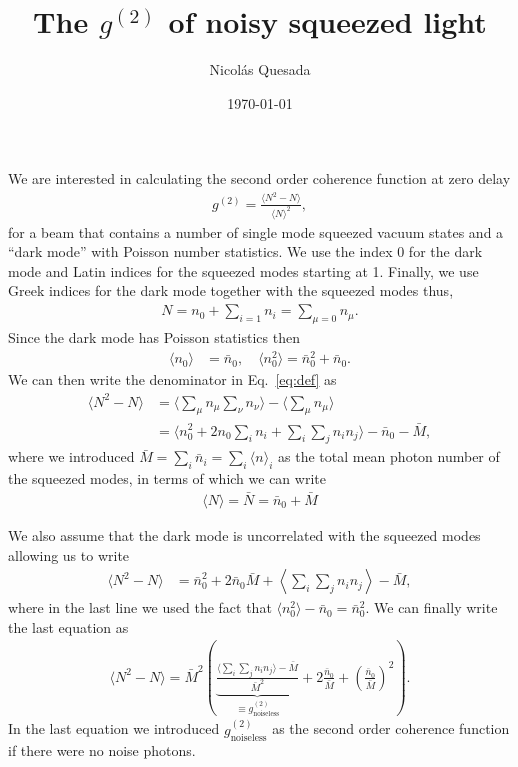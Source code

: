 \documentclass[aps,twocolumn,reprint,nofootinbib]{revtex4-1}
\newcommand{\braket}[1]{\langle #1 \rangle}
\newcommand{\eq}[1]{\begin{align}#1\end{align}}
\begin{document}
	
	\title{The $g^{(2)}$ of noisy squeezed light}
	\author{Nicol\'as Quesada}
	\date{\today}
	\maketitle

\maketitle

We are interested in calculating the second order coherence function at zero delay 
\eq{\label{eq:def}
g^{(2)} = \frac{\braket{N^2-N}}{\braket{N}^2},
}
for a beam that contains a number of single mode squeezed vacuum states and a ``dark mode'' with Poisson number statistics.
We use the index 0 for the dark mode and Latin indices for the squeezed modes starting at 1. Finally, we use Greek indices for the dark mode together with the squeezed modes thus,
\eq{
N = n_0+\sum_{i=1} n_i = \sum_{\mu=0} n_\mu.	
}
Since the dark mode has Poisson statistics then
\eq{
\braket{n_0} &= \bar{n}_0, \quad \braket{n_0^2} = \bar{n}_0^2+\bar{n}_0.
}
We can then write the denominator in Eq.~\eqref{eq:def} as
\eq{
\braket{N^2-N} &= \braket{\sum_{\mu} n_\mu \sum_{\nu} n_\nu}	- \braket{\sum_{\mu }n_\mu} \\
&=\braket{n_0^2+2n_0 \sum_i n_i +\sum_{i}\sum_j n_i n_j} - \bar{n}_0 - \bar{M},
}
where we introduced $\bar{M} = \sum_i \bar{n}_i = \sum_i \braket{n}_i$ as the total mean photon number of the squeezed modes, in terms of which we can write
\eq{
\braket{N} = \bar{N} =  \bar{n}_0	+ \bar{M}
}

We also assume that the dark mode is uncorrelated with the squeezed modes allowing us to write
\eq{
\braket{N^2-N} &=	\bar{n}_0^2 + 2 \bar{n}_0 \bar{M} + \left\langle \sum_{i}\sum_j n_i n_j \right\rangle - \bar{M},
}
where in the last line we used the fact that $\braket{n_0^2} -\bar{n}_0 = \bar{n}_0^2$.
We can finally write the last equation as
\eq{
\braket{N^2-N} = \bar{M}^2 \left( \underbrace{\frac{\braket{\sum_{i}\sum_j n_i n_j} - \bar{M}}{\bar{M}^2}}_{\equiv g^{(2)}_{\text{noiseless}}} + 2 \frac{\bar{n}_0}{\bar M} +\left(\frac{\bar{n}_0}{\bar M} \right)^2 \right).
}
In the last equation we introduced $g^{(2)}_{\text{noiseless}}$ as the second order coherence function if there were no noise photons. 
\end{document}
